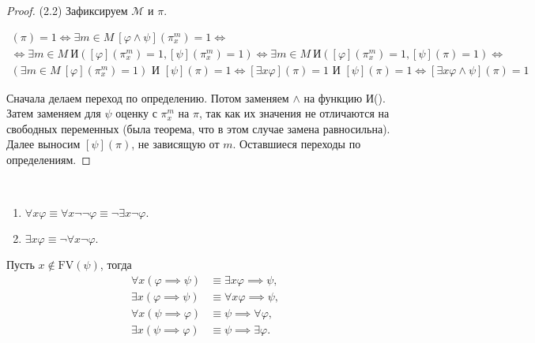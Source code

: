 \documentclass[a4paper, fleqn]{article}
\begin{document}
    \begin{proof} {(2.2)}
        Зафиксируем $\mathcal{M}$ и $\pi$.
    

        \begin{multline}
            [\exists x (\varphi \land \psi)](\pi) = 1 \iff 
            \exists m \in M~ [\varphi \land \psi]\left(\pi_{x}^{m}\right) = 1 \iff \\
            \iff \exists m \in M~ \text{И}\left([\varphi]\left(\pi_{x}^{m}\right) = 1, [\psi]\left(\pi_{x}^{m}\right) = 1\right) \iff 
            \exists m \in M~ \text{И}\left([\varphi]\left(\pi_{x}^{m}\right) = 1, [\psi]\left(\pi\right) = 1\right) \iff \\
            \left( \exists m \in M~  [\varphi]\left(\pi_{x}^{m}\right) = 1\right) \text{ И } [\psi]\left(\pi\right) = 1 \iff
            [\exists x \varphi](\pi) = 1 \text{ И } [\psi](\pi) = 1 \iff 
            [\exists x \varphi \land \psi](\pi) = 1
        \end{multline}

        Сначала делаем переход по определению. Потом заменяем $\land$ на функцию И(). 
        Затем заменяем для $\psi$ оценку с $\pi_{x}^{m}$ на $\pi$, так как их значения не 
        отличаются на свободных переменных (была теорема, что в этом случае замена равносильна). 
        Далее выносим $[\psi]\left(\pi\right)$, не зависящую от $m$. Оставшиеся переходы 
        по определениям. 
    \end{proof}

    \begin{corollary} \
        \begin{enumerate}[topsep=0pt]
            \item $\forall x \varphi \equiv \forall x \neg \neg \varphi \equiv \neg \exists x \neg \varphi.$
            \item $\exists x \varphi \equiv \neg \forall x \neg \varphi.$
        \end{enumerate}
    \end{corollary}

    \begin{corollary}
        Пусть $x \notin \text{FV}(\psi)$, тогда
        \begin{align}
            \forall x (\varphi \implies \psi) &\equiv \exists x\varphi \implies \psi, \\
            \exists x (\varphi \implies \psi) &\equiv \forall x\varphi \implies \psi, \\
            \forall x (\psi \implies \varphi) &\equiv \psi \implies \forall \varphi, \\
            \exists x (\psi \implies \varphi) &\equiv \psi \implies \exists \varphi.
        \end{align}
    \end{corollary}
    
\end{document}
